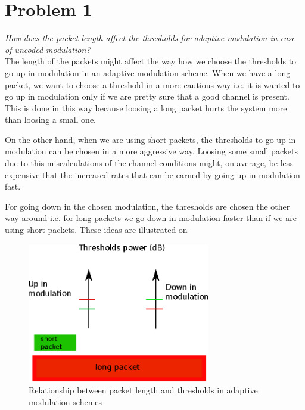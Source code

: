 \section{Problem 1} \label{sec:mm5_Pb1}
\textit{How does the packet length affect the thresholds for adaptive modulation in case of uncoded modulation?}\\

The length of the packets might affect the way how we choose the thresholds to go up in modulation in an adaptive modulation scheme. When we have a long packet, we want to choose a threshold in a more cautious way i.e. it is wanted to go up in modulation only if we are pretty sure that a good channel is present. This is done in this way because loosing a long packet hurts the system more than loosing a small one.

On the other hand, when we are using short packets, the thresholds to go up in modulation can be chosen in a more aggressive way. Loosing some small packets due to this miscalculations of the channel conditions might, on average, be less expensive that the increased rates that can be earned by going up in modulation fast.

For going down in the chosen modulation, the thresholds are chosen the other way around i.e. for long packets we go down in modulation faster than if we are using short packets. These ideas are illustrated on 


\begin{figure}[!h]
  \centering
  \includegraphics[width=8cm]{figures/thresholds_packet_size.eps}
  \caption{Relationship between packet length and thresholds in adaptive modulation schemes}
  \label{fig:thresholds_packet_size}
\end{figure}